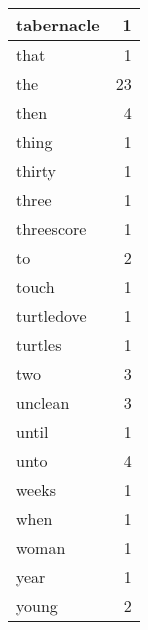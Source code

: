 \begin{center}
\begin{longtable}{l|r}
tabernacle & 1 \\ \hline
that & 1 \\ \hline
the & 23 \\ \hline
then & 4 \\ \hline
thing & 1 \\ \hline
thirty & 1 \\ \hline
three & 1 \\ \hline
threescore & 1 \\ \hline
to & 2 \\ \hline
touch & 1 \\ \hline
turtledove & 1 \\ \hline
turtles & 1 \\ \hline
two & 3 \\ \hline
unclean & 3 \\ \hline
until & 1 \\ \hline
unto & 4 \\ \hline
weeks & 1 \\ \hline
when & 1 \\ \hline
woman & 1 \\ \hline
year & 1 \\ \hline
young & 2 \\ \hline
\end{longtable}
\end{center}



\normalsize



